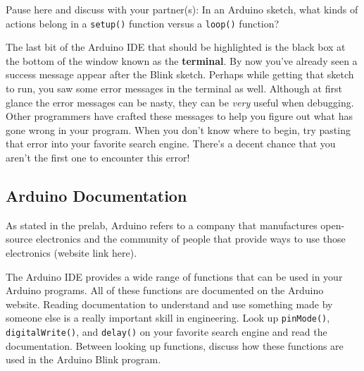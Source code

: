 \documentclass[12pt]{article}
\begin{document}
        Pause here and discuss with your partner(s): In an Arduino sketch, what kinds of actions belong in a \verb|setup()| function versus a \verb|loop()| function?\newline
        
        The last bit of the Arduino IDE that should be highlighted is the black box at the bottom of the window known as the \textbf{terminal}. By now you've already seen a success message appear after the Blink sketch. Perhaps while getting that sketch to run, you saw some error messages in the terminal as well. Although at first glance the error messages can be nasty, they can be \textit{very} useful when debugging. Other programmers have crafted these messages to help you figure out what has gone wrong in your program. When you don't know where to begin, try pasting that error into your favorite search engine. There's a decent chance that you aren't the first one to encounter this error! 

       \subsection*{Arduino Documentation}
       As stated in the prelab, Arduino refers to a company that manufactures open-source electronics and the community of people that provide ways to use those electronics (website link here).\newline 

        The Arduino IDE provides a wide range of functions that can be used in your Arduino programs. All of these functions are documented on the Arduino website. Reading documentation to understand and use something made by someone else is a really important skill in engineering. Look up \verb|pinMode()|, \verb|digitalWrite()|, and \verb|delay()| on your favorite search engine and read the documentation. Between looking up functions, discuss how these functions are used in the Arduino Blink program. 

        
\end{document}

